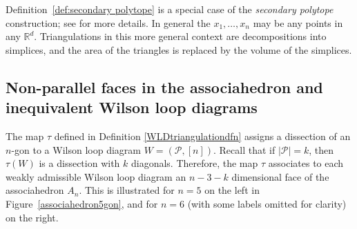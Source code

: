\documentclass[11pt]{article}
\newcommand{\cP}{\mathcal{P}}
\theoremstyle{remark}
\theoremstyle{definition}
\begin{document}
Definition~\ref{def:secondary polytope} is a special case of the {\em secondary polytope} construction; see \cite[Definition 9.9]{Ziegler} for more details.  In general the $x_1, \ldots, x_n$ may be any points in any $\mathbb{R}^d$.  Triangulations in this more general context are decompositions into simplices, and the area of the triangles is replaced by the volume of the simplices.  




\subsection{Non-parallel faces in the associahedron and inequivalent Wilson loop diagrams}\label{sec associahedron results}

The map $\tau$ defined in Definition \ref{WLDtriangulationdfn} assigns a dissection of an $n$-gon to a Wilson loop diagram $W = (\cP, [n])$. Recall that if $|\cP| = k$, then $\tau(W)$ is a dissection with $k$ diagonals. Therefore, the map $\tau$ associates to each weakly admissible Wilson loop diagram an $n-3 - k$ dimensional face of the associahedron $A_n$. This is illustrated for $n=5$ on the left in Figure~\ref{associahedron5gon}, and for $n=6$ (with some labels omitted for clarity) on the right.
\end{document}
